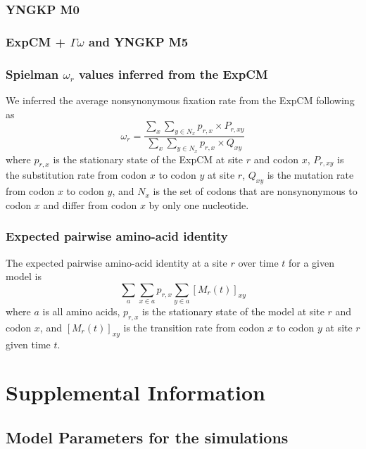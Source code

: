 \documentclass[11pt]{article}
\begin{document}
\subsubsection*{YNGKP M0}

\subsubsection*{ExpCM + $\Gamma\omega$ and YNGKP M5}


\subsubsection*{Spielman $\omega_{r}$ values inferred from the ExpCM} 
We inferred the average nonsynonymous fixation rate from the ExpCM following~\citet{spielman2015relationship} as 
\begin{equation}
\label{eq:w_r}
\omega_{r} = \frac{\sum_{x} \sum_{y \in N_x} {p_{r,x} \times P_{r,xy}}}{\sum_{x} \sum_{y \in N_x} {p_{r,x} \times Q_{xy}}}
\end{equation}
where $p_{r,x}$ is the stationary state of the ExpCM at site $r$ and codon $x$, $P_{r,xy}$ is the substitution rate from codon $x$ to codon $y$ at site $r$, $Q_{xy}$ is the mutation rate from codon $x$ to codon $y$, and $N_x$ is the set of codons that are nonsynonymous to codon $x$ and differ from codon $x$ by only one nucleotide. 

\subsubsection*{Expected pairwise amino-acid identity}
The expected pairwise amino-acid identity at a site $r$ over time $t$ for a given model is 
\begin{equation}
\label{eq:f}
\sum_a \sum_{x \in a} p_{r,x} \sum_{y \in a} [M_{r}\left(t\right)]_{xy}
\end{equation}
where $a$ is all amino acids, $p_{r,x}$ is the stationary state of the model at site $r$ and codon $x$, and $[M_{r}\left(t\right)]_{xy}$ is the transition rate from codon $x$ to codon $y$ at site $r$ given time $t$. 

\newpage
\section*{Supplemental Information}

\subsection*{Model Parameters for the simulations}
\end{document}
